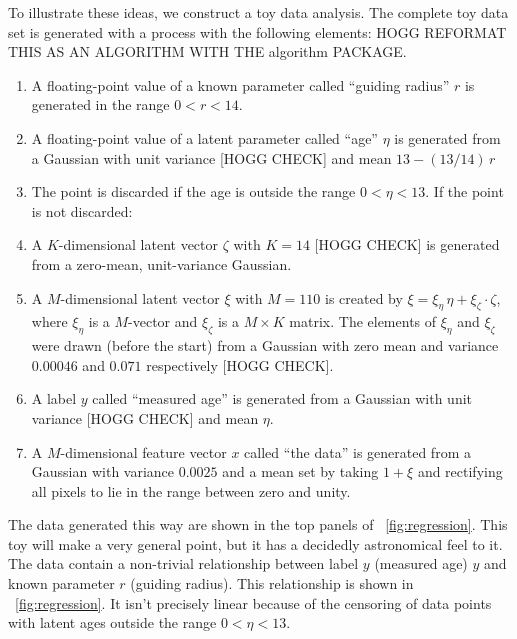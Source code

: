 \documentclass[11pt]{article}
\begin{document}
To illustrate these ideas, we construct a toy data analysis.
The complete toy data set is generated with a process with the following elements:
HOGG REFORMAT THIS AS AN ALGORITHM WITH THE algorithm PACKAGE.
\begin{enumerate}\setlength{\itemsep}{0in}
    \item A floating-point value of a known parameter called ``guiding radius'' $r$ is generated in the range $0<r<14$.
    \item A floating-point value of a latent parameter called ``age'' $\eta$ is generated from a Gaussian with unit variance [HOGG CHECK] and mean $13 - (13/14)\,r$
    \item The point is discarded if the age is outside the range $0<\eta<13$. If the point is not discarded:
    \item A $K$-dimensional latent vector $\zeta$ with $K=14$ [HOGG CHECK] is generated from a zero-mean, unit-variance Gaussian.
    \item A $M$-dimensional latent vector $\xi$ with $M=110$ is created by $\xi = \xi_\eta\,\eta + \xi_\zeta\cdot\zeta$, where $\xi_\eta$ is a $M$-vector and $\xi_\zeta$ is a $M\times K$ matrix. The elements of $\xi_\eta$ and $\xi_\zeta$ were drawn (before the start) from a Gaussian with zero mean and variance $0.00046$ and $0.071$ respectively [HOGG CHECK].
    \item A label $y$ called ``measured age'' is generated from a Gaussian with unit variance [HOGG CHECK] and mean $\eta$.
    \item A $M$-dimensional feature vector $x$ called ``the data'' is generated from a Gaussian with variance $0.0025$ and a mean set by taking $1 + \xi$ and rectifying all pixels to lie in the range between zero and unity.
\end{enumerate}
The data generated this way are shown in the top panels of \figurename~\ref{fig:regression}.
This toy will make a very general point, but it has a decidedly astronomical feel to it.
The data contain a non-trivial relationship between label $y$ (measured age) $y$ and known parameter $r$ (guiding radius).
This relationship is shown in \figurename~\ref{fig:regression}.
It isn't precisely linear because of the censoring of data points with latent ages outside the range $0<\eta<13$.
\end{document}
